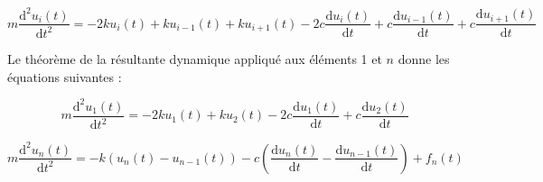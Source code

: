 \documentclass[10pt,fleqn]{article} %
\begin{document}
\begin{equation}
m\dfrac{\text{d}^2u_i(t)}{\text{d}t^2} = 
- 2 k u_i(t)  + k u_{i-1}(t) + k u_{i+1}(t)
- 2c \dfrac{\text{d}u_i(t)}{\text{d}t}   +c \dfrac{\text{d}u_{i-1}(t)}{\text{d}t} +c \dfrac{\text{d}u_{i+1}(t)}{\text{d}t}
\end{equation}

Le théorème de la résultante dynamique appliqué aux éléments 1 et $n$ donne les équations suivantes : 
%


\begin{equation}
m\dfrac{\text{d}^2u_1(t)}{\text{d}t^2} = 
- 2k u_1(t) + k u_2 (t) 
-2c \dfrac{\text{d}u_1(t)}{\text{d}t} 
+ c \dfrac{\text{d}u_2(t)}{\text{d}t} 
\end{equation}

\begin{equation}
m\dfrac{\text{d}^2u_n(t)}{\text{d}t^2} = 
-k\left(u_n(t)-u_{n-1}(t) \right)   - c\left(\dfrac{\text{d}u_{n}(t)}{\text{d}t}-\dfrac{\text{d}u_{n-1}(t)}{\text{d}t} \right) +f_n(t)
\end{equation}


\begin{minipage}[c]{.77\linewidth}


\begin{obj}

\end{obj}
\end{minipage} \hfill
\begin{minipage}[c]{.2\linewidth}

\end{minipage}
\end{document}
